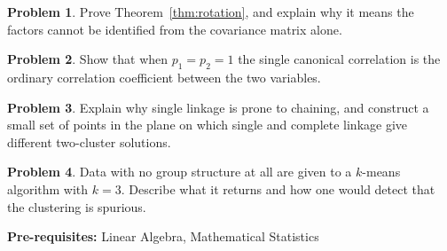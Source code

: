 \documentclass[11pt,a4paper]{article}
\theoremstyle{definition}
\newtheorem{problemx}{Problem}[section]
\newenvironment{problem}{\begin{problemx}}{\end{problemx}}
\begin{document}
\begin{problem}
Prove Theorem~\ref{thm:rotation}, and explain why it means the factors cannot be
identified from the covariance matrix alone.
\end{problem}

\begin{problem}
Show that when $p_1=p_2=1$ the single canonical correlation is the ordinary
correlation coefficient between the two variables.
\end{problem}

\begin{problem}
Explain why single linkage is prone to chaining, and construct a small set of
points in the plane on which single and complete linkage give different
two-cluster solutions.
\end{problem}

\begin{problem}
Data with no group structure at all are given to a $k$-means algorithm with
$k=3$. Describe what it returns and how one would detect that the clustering is
spurious.
\end{problem}


\pagebreak


\textbf{Pre-requisites:} Linear Algebra, Mathematical Statistics\\
\end{document}
